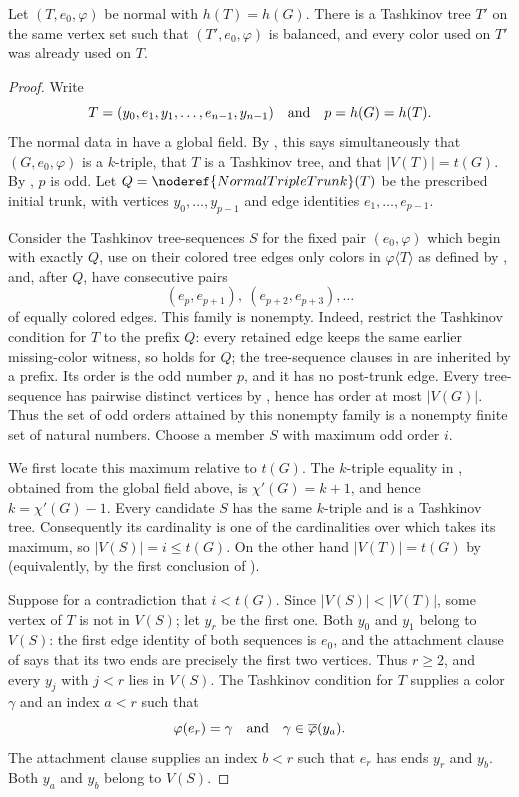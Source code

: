 \begin{lemma}
Let $(T,e_0,\varphi)$ be normal with $h(T)=h(G)$.  There is a Tashkinov
tree $T'$ on the same vertex set such that $(T',e_0,\varphi)$ is balanced,
and every color used on $T'$ was already used on $T$.
\end{lemma}
\begin{proof}
Write
\[
 T=(y_0,e_1,y_1,\ldots,e_{n-1},y_{n-1})
 \quad\hbox{and}\quad p=h(G)=h(T).
\]
The normal data in  have a global
field.  By , this says simultaneously that
$(G,e_0,\varphi)$ is a $k$-triple, that $T$ is a Tashkinov tree, and that
$|V(T)|=t(G)$.  By , $p$ is odd.  Let
$Q=\noderef{NormalTripleTrunk}(T)$ be the prescribed initial trunk, with
vertices $y_0,\ldots,y_{p-1}$ and edge identities
$e_1,\ldots,e_{p-1}$.

Consider the Tashkinov tree-sequences $S$ for the fixed pair
$(e_0,\varphi)$ which begin with exactly $Q$, use on their colored tree
edges only colors in $\varphi\langle T\rangle$ as defined by
, and, after $Q$, have consecutive pairs
\[
 (e_p,e_{p+1}),\ (e_{p+2},e_{p+3}),\ldots
\]
of equally colored edges.  This family is nonempty.  Indeed, restrict the
Tashkinov condition for $T$ to the prefix $Q$: every retained edge keeps
the same earlier missing-color witness, so  holds
for $Q$; the tree-sequence clauses in  are inherited
by a prefix.  Its order is the odd number $p$, and it has no post-trunk
edge.  Every tree-sequence has pairwise distinct vertices by
, hence has order at most $|V(G)|$.  Thus the set of
odd orders attained by this nonempty family is a nonempty finite set of
natural numbers.  Choose a member $S$ with maximum odd order $i$.

We first locate this maximum relative to $t(G)$.  The $k$-triple equality
in , obtained from the global field above, is
$\chi'(G)=k+1$, and hence $k=\chi'(G)-1$.  Every candidate $S$ has the same
$k$-triple and is a Tashkinov tree.  Consequently its cardinality is one
of the cardinalities over which  takes its
maximum, so $|V(S)|=i\leq t(G)$.  On the other hand
$|V(T)|=t(G)$ by  (equivalently, by the first
conclusion of ).

Suppose for a contradiction that $i<t(G)$.  Since
$|V(S)|<|V(T)|$, some vertex of $T$ is not in $V(S)$; let $y_r$ be the
first one.  Both $y_0$ and $y_1$ belong to $V(S)$: the first edge identity
of both sequences is $e_0$, and the attachment clause of
 says that its two ends are precisely the first two
vertices.  Thus $r\geq2$, and every $y_j$ with $j<r$ lies in $V(S)$.
The Tashkinov condition for $T$ supplies a color $\gamma$ and an index
$a<r$ such that
\[
 \varphi(e_r)=\gamma
 \quad\hbox{and}\quad
 \gamma\in\overline\varphi(y_a).
\]
The attachment clause supplies an index $b<r$ such that $e_r$ has ends
$y_r$ and $y_b$.  Both $y_a$ and $y_b$ belong to $V(S)$.


\end{proof}
